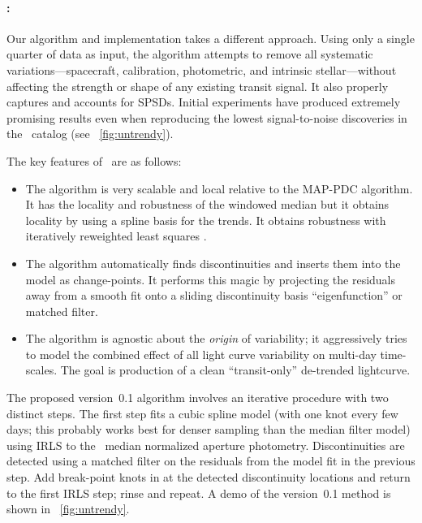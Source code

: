 \documentclass[letterpaper,12pt,preprint]{hack_aastex}
\newcommand{\Untrendy}{\package{Untrendy}}
\begin{document}
\paragraph{\Untrendy:}
Our algorithm and implementation takes a
different approach.
Using only a single quarter of data as input, the algorithm attempts to
remove all systematic variations---spacecraft, calibration, photometric, and
intrinsic stellar---without affecting the strength or shape of any existing
transit signal.
It also properly captures and accounts for SPSDs.
Initial experiments have produced extremely promising results even when
reproducing the lowest signal-to-noise discoveries in the \Kepler\ catalog
(see \figurename~\ref{fig:untrendy}).

The key features of \Untrendy\ are as follows:
\begin{itemize}
\item The algorithm is very scalable and local relative to the MAP-PDC
  algorithm.  It has the locality and robustness of the
  windowed median but
  it obtains locality by using a spline basis for the trends.  It obtains
  robustness with iteratively reweighted least squares \citep[IRLS; for
  example][]{blind}.
\item The algorithm automatically finds discontinuities and inserts
  them into the model as change-points.
  It performs this magic by projecting the residuals away from a smooth fit
  onto a sliding discontinuity basis ``eigenfunction'' or matched filter.
\item The algorithm is agnostic about the \emph{origin} of variability; it
  aggressively tries to model the combined effect of all light curve variability
  on multi-day time-scales.
  The goal is production of a clean ``transit-only'' de-trended lightcurve.
\end{itemize}

The proposed version~0.1 algorithm involves an iterative procedure with two
distinct steps.
The first step fits a cubic spline model (with one knot every few days; this
probably works best for denser sampling than the median filter model) using
IRLS to the \Kepler\ median normalized aperture photometry.
Discontinuities are detected using a matched filter on the residuals
from the model fit in the previous step.
Add break-point knots in at the detected discontinuity locations and return to the first IRLS
step; rinse and repeat.  A demo of the version~0.1 method is shown in
\figurename~\ref{fig:untrendy}.%
\end{document}
